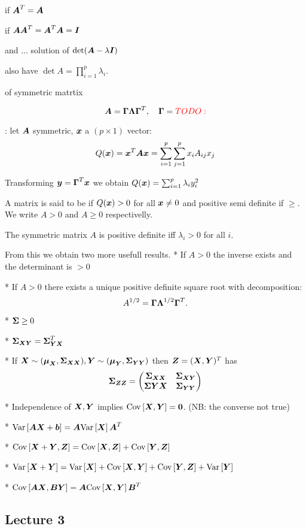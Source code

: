  if $\mA^T=\mA$

 if $\mA\mA^T=\mA^T\mA=\mI$

 and  ... solution of $\det(\mA-\lambda \mI)$

also have $\det{A} = \prod_{i=1}^p \lambda_i$.

 of symmetric matrtix

$$
    \mA=\mG\mL\mG^T, \quad \mG = \TODO{}
$$

: let $\mA$ symmetric, $\x$ a $(p\times 1)$ vector:
$$
    Q(\x) = \x^T \mA \x = \sum_{i=1}^p\sum_{j=1}^p x_i A_{ij} x_j
$$
\begin{theorem}
    Transforming $\y=\mG^T\x$ we obtain $Q(\x) = \sum_{i=1}^p \lambda_i y_i^2$
\end{theorem}
A matrix is said to be  if $Q(\x)>0$ for all $\x\ne0$ and positive semi definite if $\geq$. We write $A>0$ and $A\geq 0$ respectivelly. 
\begin{theorem}
    The symmetric matrix $A$ is positive definite iff $\lambda_i > 0$ for all $i$.
\end{theorem}
From this we obtain two more usefull results. 
* If $A>0$ the inverse exists and the determinant is $>0$

* If $A>0$ there exists a unique positive definite square root with decomposition:
$$
    A^{1/2} = \mG\mL^{1/2}\mG^T.
$$

* $\SS \geq 0$

* $\SS_{\X\Y} = \SS_{\Y\X}^T$

* If $\X\sim(\M_{\X}, \SS_{\X\X}), \Y\sim(\M_{\Y}, \SS_{\Y\Y})$ then $\Z=(\X,\Y)^T$ has
$$
    \SS_{\Z\Z} = \begin{pmatrix}
        \SS_{\X\X} & \SS_{\X\Y} \\ \SS{\Y\X} & \SS_{\Y\Y}
    \end{pmatrix}
$$

* Independence of $\X,\Y$ implies $\cov{\X,\Y}=\zero$. (NB: the converse not true)

* $\var{\mA\X+\boldsymbol{b}} = \mA \var{\X}\mA^T$

* $\cov{\X+\Y, \Z} = \cov{\X, \Z} + \cov{\Y, \Z}$

* $\var{\X+\Y} = \var{\X} + \cov{\X, \Y} + \cov{\Y, \Z} + \var{\Y}$

* $\cov{\mA\X, \mB\Y} = \mA\cov{\X, \Y}\mB^T$


\subsection*{Lecture 3}


